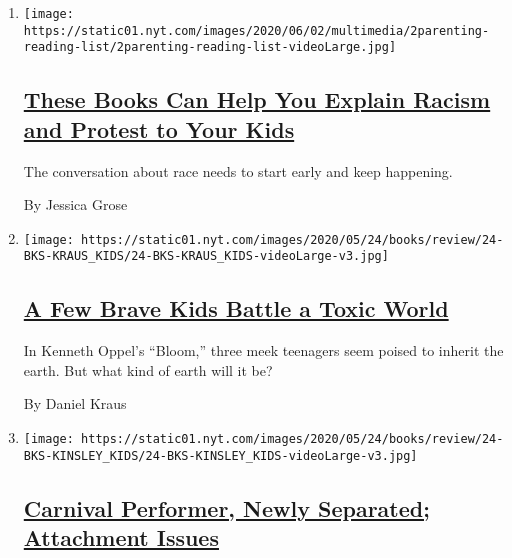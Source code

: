 \begin{enumerate}
\def\labelenumi{\arabic{enumi}.}
\item
  \texttt{[image: https://static01.nyt.com/images/2020/06/02/multimedia/2parenting-reading-list/2parenting-reading-list-videoLarge.jpg]}

  \hypertarget{these-books-can-help-you-explain-racism-and-protest-to-your-kids}{%
  \subsection{\texorpdfstring{\href{/2020/06/02/parenting/kids-books-racism-protest.html}{These
  Books Can Help You Explain Racism and Protest to Your
  Kids}}{These Books Can Help You Explain Racism and Protest to Your Kids}}\label{these-books-can-help-you-explain-racism-and-protest-to-your-kids}}

  The conversation about race needs to start early and keep happening.

  By Jessica Grose
\item
  \texttt{[image: https://static01.nyt.com/images/2020/05/24/books/review/24-BKS-KRAUS\_KIDS/24-BKS-KRAUS\_KIDS-videoLarge-v3.jpg]}

  \hypertarget{a-few-brave-kids-battle-a-toxic-world}{%
  \subsection{\texorpdfstring{\href{/2020/05/16/books/review/bloom-kenneth-oppel.html}{A
  Few Brave Kids Battle a Toxic
  World}}{A Few Brave Kids Battle a Toxic World}}\label{a-few-brave-kids-battle-a-toxic-world}}

  In Kenneth Oppel's ``Bloom,'' three meek teenagers seem poised to
  inherit the earth. But what kind of earth will it be?

  By Daniel Kraus
\item
  \texttt{[image: https://static01.nyt.com/images/2020/05/24/books/review/24-BKS-KINSLEY\_KIDS/24-BKS-KINSLEY\_KIDS-videoLarge-v3.jpg]}

  \hypertarget{carnival-performer-newly-separated-attachment-issues}{%
  \subsection{\texorpdfstring{\href{/2020/05/16/books/review/phantom-twin-lisa-brown.html}{Carnival
  Performer, Newly Separated; Attachment
  Issues}}{Carnival Performer, Newly Separated; Attachment Issues}}\label{carnival-performer-newly-separated-attachment-issues}}


\end{enumerate}
